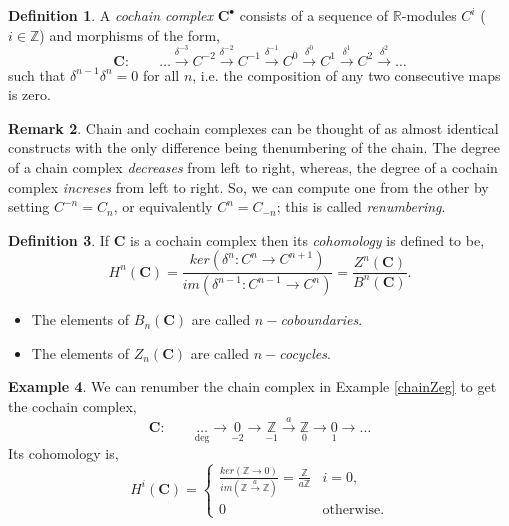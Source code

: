 \documentclass[11.5pt, twoside, a4paper, titlepage]{report}
\providecommand{\equ}[0]{\begin{equation*}}
\providecommand{\eequ}[0] {\end{equation*}}
\theoremstyle{definition}
\newtheorem{mydef}{Definition}[section]
\newtheorem{rem}[mydef]{Remark}
\newtheorem{eg}[mydef]{Example}
\theoremstyle{plain}
\begin{document}
\begin{mydef}
A \emph{cochain complex} $\mathbf{C}^{\bullet}$ consists of a sequence of $\mathbb{R}$-modules $C^i$ ($i \in \mathbb{Z}$) and morphisms of the form,
\begin{equation*}
\mathbf{C}: \qquad \dots \xrightarrow{\delta^{-3}} C^{-2} \xrightarrow{\delta^{-2}} C^{-1} \xrightarrow{\delta^{-1 }} C^0 \xrightarrow{\delta^0} C^{1} \xrightarrow{\delta^{1}} C^{2} \xrightarrow{\delta^{2}} \dots
\end{equation*}
such that $\delta^{n-1}\delta^{n}=0$ for all $n$, i.e. the composition of any two consecutive maps is zero.
\end{mydef}

\begin{rem}
Chain and cochain complexes can be thought of as almost identical constructs with the only difference being thenumbering of the chain. The degree of a chain complex \emph{decreases} from left to right, whereas, the degree of a cochain complex \emph{increses} from left to right. So, we can compute one from the other by setting $C^{-n}=C_n$, or equivalently $C^n=C_{-n}$; this is called \emph{renumbering}.
\end{rem}

\begin{mydef}
If $\mathbf{C}$ is a cochain complex then its \emph{cohomology} is defined to be,
\begin{equation*}
H^n(\mathbf{C})=\frac{ker(\delta^n:C^n \rightarrow C^{n+1})}{im(\delta^{n-1}:C^{n-1} \rightarrow C^n)} =\frac{Z^n(\mathbf{C})}{B^n(\mathbf{C})}.
\end{equation*}
\begin{itemize}
\item The elements of $B_n(\mathbf{C})$ are called \emph{$n-$coboundaries}.
\item The elements of $Z_n(\mathbf{C})$ are called \emph{$n-$cocycles}.
\end{itemize}
\end{mydef}

\begin{eg}
We can renumber the chain complex in Example \ref{chainZeg} to get the cochain complex, 
\equ
\mathbf{C}: \qquad \underset{\text{deg}}{\dots} \xrightarrow{}\underset{-2}{0} \xrightarrow{} \underset{-1}{\mathbb{Z}} \xrightarrow{a}\underset{0}{\mathbb{Z}} \xrightarrow{} \underset{1}{0} \xrightarrow{}\dots 
\eequ
Its cohomology is,
\equ
H^i(\mathbf{C}) = 
\begin{cases}
\frac{ker(\mathbb{Z}\xrightarrow{} 0)}{im(\mathbb{Z}\xrightarrow{a}\mathbb{Z})}=\frac{\mathbb{Z}}{a\mathbb{Z}} & i=0,\\
0 & \text{otherwise}.
\end{cases}
\eequ
\end{eg}
\end{document}
